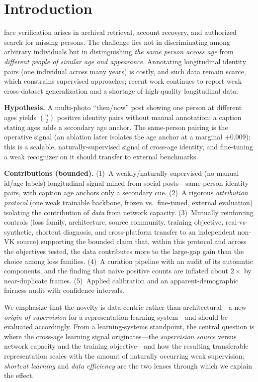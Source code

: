\documentclass[journal]{IEEEtran}
\begin{document}
\section{Introduction}\label{sec:intro}
 face verification arises in archival retrieval, account recovery, and authorized search for missing persons. The challenge lies not in discriminating among arbitrary individuals but in distinguishing \emph{the same person across age} from \emph{different people of similar age and appearance}. Annotating longitudinal identity pairs (one individual across many years) is costly, and such data remain scarce, which constrains supervised approaches; recent work continues to report weak cross-dataset generalization and a shortage of high-quality longitudinal data.

\textbf{Hypothesis.} A multi-photo ``then/now'' post showing one person at different ages yields $\binom{n}{2}$ positive identity pairs without manual annotation; a caption stating ages adds a secondary age anchor. The same-person pairing is the operative signal (an ablation later isolates the age anchor at a marginal $+$0.009); this is a scalable, naturally-supervised signal of cross-age identity, and fine-tuning a weak recognizer on it should transfer to external benchmarks.

\textbf{Contributions (bounded).}
(1)~A weakly/naturally-supervised (no manual id/age labels) longitudinal signal mined from social posts---same-person identity pairs, with caption age anchors only a secondary cue.
(2)~A rigorous \emph{attribution protocol} (one weak trainable backbone, frozen vs.\ fine-tuned, external evaluation) isolating the contribution of \emph{data} from network capacity.
(3)~Mutually reinforcing controls (loss family, architecture, source community, training objective, real-vs-synthetic, shortcut diagnosis, and cross-platform transfer to an independent non-VK source) supporting the bounded claim that, within this protocol and across the objectives tested, the data contributes more to the large-gap gain than the choice among loss families.
(4)~A curation pipeline with an audit of its automatic components, and the finding that naive positive counts are inflated about $2\times$ by near-duplicate frames.
(5)~Applied calibration and an apparent-demographic fairness audit with confidence intervals.

We emphasize that the novelty is data-centric rather than architectural---a new \emph{origin of supervision} for a representation-learning system---and should be evaluated accordingly. From a learning-systems standpoint, the central question is where the cross-age learning signal originates---the \emph{supervision source} versus network capacity and the training objective---and how the resulting transferable representation scales with the amount of naturally occurring weak supervision; \emph{shortcut learning} and \emph{data efficiency} are the two lenses through which we explain the effect.
\end{document}

